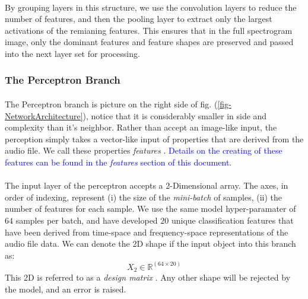 \documentclass[12pt,letterpaper]{article}
\begin{document}
\paragraph*{}By grouping layers in this structure, we use the convolution  layers to reduce the number of features, and then the pooling layer to extract only the largest activations of the remianing features. This ensures that in the full spectrogram image, only the dominant features and feature shapes are preserved and passed into the next layer set for processing.


\subsubsection{The Perceptron Branch}

\paragraph*{} The Perceptron branch is picture on the right side of fig. (\ref{fig-NetworkArchitecture}), notice that it is considerably smaller in side and complexity than it's neighbor. Rather than accept an image-like input, the perception simply takes a vector-like input of properties that are derived from the audio file. We call these properties \textit{features} \cite{Geron,Kahn,Virtanen}. \textcolor{blue}{Details on the creating of these features can be found in the \textit{features} section of this document.}

\paragraph*{}The input layer of the perceptron accepts a 2-Dimensional array. The axes, in order of indexing, represent (i) the size of the \textit{mini-batch} of samples, (ii) the number of features for each sample. We use the same model hyper-paramater of $64$ samples per batch, and have developed $20$ unique classification features that have been derived from time-space and frequency-space representations of the audio file data. We can denote the 2D shape if the input object into this branch as:
\begin{equation}
\label{eqn-shapeX2}
X_2 \in \mathbb{R}^{(64 \times 20)}
\end{equation}
This 2D is referred to as a \textit{design matrix} \cite{James,Loy}. Any other shape will be rejected by the model, and an error is raised.
\end{document}

